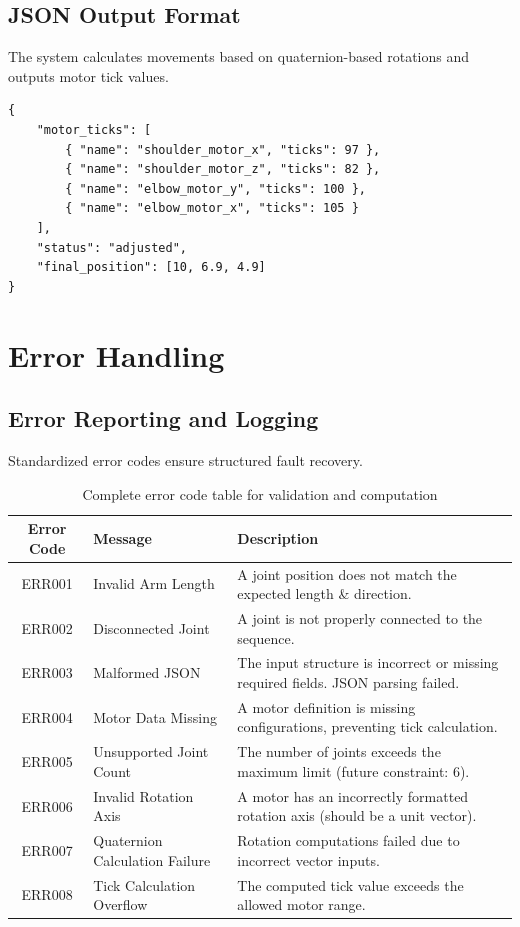 \documentclass{article}
\begin{document}
\subsection{JSON Output Format}
The system calculates movements based on quaternion-based rotations and outputs motor tick values.

\begin{verbatim}
{
    "motor_ticks": [
        { "name": "shoulder_motor_x", "ticks": 97 },
        { "name": "shoulder_motor_z", "ticks": 82 },
        { "name": "elbow_motor_y", "ticks": 100 },
        { "name": "elbow_motor_x", "ticks": 105 }
    ],
    "status": "adjusted",
    "final_position": [10, 6.9, 4.9]
}
\end{verbatim}

\section{Error Handling}
\subsection{Error Reporting and Logging}
Standardized error codes ensure structured fault recovery.

\begin{table}[H]
\centering
\begin{tabular}{|c|l|p{8cm}|}
\hline
\textbf{Error Code} & \textbf{Message} & \textbf{Description} \\
\hline
ERR001 & Invalid Arm Length & A joint position does not match the expected length \& direction. \\
\hline
ERR002 & Disconnected Joint & A joint is not properly connected to the sequence. \\
\hline
ERR003 & Malformed JSON & The input structure is incorrect or missing required fields. JSON parsing failed. \\
\hline
ERR004 & Motor Data Missing & A motor definition is missing configurations, preventing tick calculation. \\
\hline
ERR005 & Unsupported Joint Count & The number of joints exceeds the maximum limit (future constraint: 6). \\
\hline
ERR006 & Invalid Rotation Axis & A motor has an incorrectly formatted rotation axis (should be a unit vector). \\
\hline
ERR007 & Quaternion Calculation Failure & Rotation computations failed due to incorrect vector inputs. \\
\hline
ERR008 & Tick Calculation Overflow & The computed tick value exceeds the allowed motor range. \\
\hline
\end{tabular}
\caption{Complete error code table for validation and computation}
\end{table}
\end{document}
